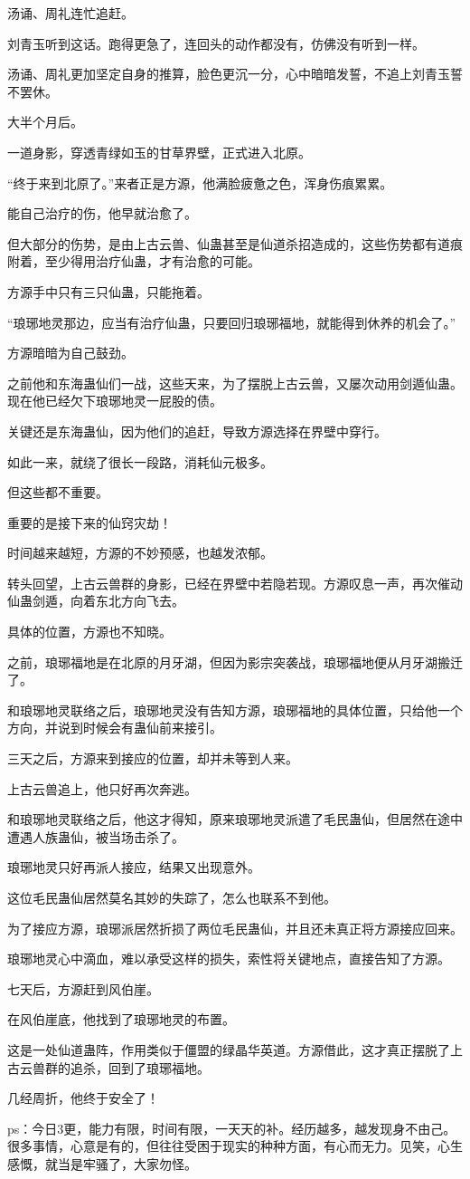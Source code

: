 \begin{this_body}
汤诵、周礼连忙追赶。

刘青玉听到这话。跑得更急了，连回头的动作都没有，仿佛没有听到一样。

汤诵、周礼更加坚定自身的推算，脸色更沉一分，心中暗暗发誓，不追上刘青玉誓不罢休。

大半个月后。

一道身影，穿透青绿如玉的甘草界壁，正式进入北原。

“终于来到北原了。”来者正是方源，他满脸疲惫之色，浑身伤痕累累。

能自己治疗的伤，他早就治愈了。

但大部分的伤势，是由上古云兽、仙蛊甚至是仙道杀招造成的，这些伤势都有道痕附着，至少得用治疗仙蛊，才有治愈的可能。

方源手中只有三只仙蛊，只能拖着。

“琅琊地灵那边，应当有治疗仙蛊，只要回归琅琊福地，就能得到休养的机会了。”

方源暗暗为自己鼓劲。

之前他和东海蛊仙们一战，这些天来，为了摆脱上古云兽，又屡次动用剑遁仙蛊。现在他已经欠下琅琊地灵一屁股的债。

关键还是东海蛊仙，因为他们的追赶，导致方源选择在界壁中穿行。

如此一来，就绕了很长一段路，消耗仙元极多。

但这些都不重要。

重要的是接下来的仙窍灾劫！

时间越来越短，方源的不妙预感，也越发浓郁。

转头回望，上古云兽群的身影，已经在界壁中若隐若现。方源叹息一声，再次催动仙蛊剑遁，向着东北方向飞去。

具体的位置，方源也不知晓。

之前，琅琊福地是在北原的月牙湖，但因为影宗突袭战，琅琊福地便从月牙湖搬迁了。

和琅琊地灵联络之后，琅琊地灵没有告知方源，琅琊福地的具体位置，只给他一个方向，并说到时候会有蛊仙前来接引。

三天之后，方源来到接应的位置，却并未等到人来。

上古云兽追上，他只好再次奔逃。

和琅琊地灵联络之后，他这才得知，原来琅琊地灵派遣了毛民蛊仙，但居然在途中遭遇人族蛊仙，被当场击杀了。

琅琊地灵只好再派人接应，结果又出现意外。

这位毛民蛊仙居然莫名其妙的失踪了，怎么也联系不到他。

为了接应方源，琅琊派居然折损了两位毛民蛊仙，并且还未真正将方源接应回来。

琅琊地灵心中滴血，难以承受这样的损失，索性将关键地点，直接告知了方源。

七天后，方源赶到风伯崖。

在风伯崖底，他找到了琅琊地灵的布置。

这是一处仙道蛊阵，作用类似于僵盟的绿晶华英道。方源借此，这才真正摆脱了上古云兽群的追杀，回到了琅琊福地。

几经周折，他终于安全了！

ps：今日3更，能力有限，时间有限，一天天的补。经历越多，越发现身不由己。很多事情，心意是有的，但往往受困于现实的种种方面，有心而无力。见笑，心生感慨，就当是牢骚了，大家勿怪。

\end{this_body}

